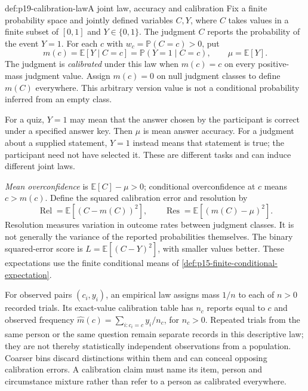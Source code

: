 \begin{hbdefinition}{def:p19-calibration-law}{A joint law, accuracy and calibration}
Fix a finite probability space and jointly defined variables \(C,Y\), where
\(C\) takes values in a finite subset of \([0,1]\) and \(Y\in\{0,1\}\).
The judgment \(C\) reports the probability of the event \(Y=1\).
For each \(c\) with \(w_c=\mathbb P(C=c)>0\), put
\[
 m(c)=\mathbb E[Y\mid C=c]=\mathbb P(Y=1\mid C=c),\qquad
 \mu=\mathbb E[Y].
\]
The judgment is \emph{calibrated} under this law when \(m(c)=c\) on
every positive-mass judgment value. Assign \(m(c)=0\) on null judgment
classes to define \(m(C)\) everywhere. This arbitrary version value is
not a conditional probability inferred from an empty class.

For a quiz, \(Y=1\) may mean that the answer chosen by the participant is
correct under a specified answer key. Then \(\mu\) is mean answer accuracy.
For a judgment about a supplied statement, \(Y=1\) instead means that
statement is true; the participant need not have selected it. These are
different tasks and can induce different joint laws.

\emph{Mean overconfidence} is \(\mathbb E[C]-\mu>0\); conditional
overconfidence at \(c\) means \(c>m(c)\). Define the squared calibration
error and resolution by
\[
 \operatorname{Rel}=\mathbb E[(C-m(C))^2],\qquad
 \operatorname{Res}=\mathbb E[(m(C)-\mu)^2].
\]
Resolution measures variation in outcome rates between judgment classes.
It is not generally the variance of the reported probabilities themselves.
The binary squared-error score is \(L=\mathbb E[(C-Y)^2]\), with smaller
values better. These expectations use the finite conditional means of
\cref{def:p15-finite-conditional-expectation}.
\end{hbdefinition}

For observed pairs \((c_i,y_i)\), an empirical law assigns mass \(1/n\)
to each of \(n>0\) recorded trials. Its exact-value calibration table has
\(n_c\) reports equal to \(c\) and observed frequency
\(\widehat m(c)=\sum_{i:c_i=c}y_i/n_c\), for \(n_c>0\). Repeated trials from the same
person or the same question remain separate records in this descriptive law;
they are not thereby statistically independent observations from a population.
Coarser bins discard distinctions within them and can conceal opposing
calibration errors. A calibration claim must name its item, person and
circumstance mixture rather than refer to a person as calibrated everywhere.

